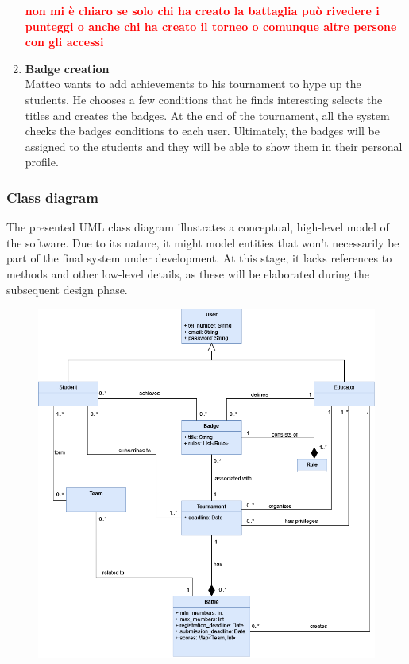 \begin{enumerate}[label=\textbf{\Alph*}.]
        \textcolor{red}{\textbf{non mi è chiaro se solo chi ha creato la battaglia può rivedere i punteggi
        o anche chi ha creato il torneo o comunque altre persone con gli accessi}}\\
    \item \textbf{Badge creation} \\
        Matteo wants to add achievements to his tournament to hype up the students. He chooses a few conditions that he finds interesting selects the titles and creates the badges. At the end of the tournament, all the system checks the badges conditions to each user. Ultimately, the badges will be assigned to the students and they will be able to show them in their personal profile.
\end{enumerate}

\subsubsection{Class diagram}
The presented UML class diagram illustrates a conceptual, high-level model of the software. Due to its nature, it might model entities that won't necessarily be part of the final system under development. At this stage, it lacks references to methods and other low-level details, as these will be elaborated during the subsequent design phase.
\begin{figure}[H]
      \centering
      \includegraphics[scale=0.4]{src/class_uml.png}
\end{figure} \vspace{1cm}

